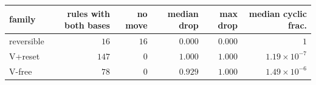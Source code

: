 \begin{tabular}{lrrrrr}
\hline
family & rules with both bases & no move & median drop & max drop & median cyclic frac. \\
\hline
reversible & $16$ & $16$ & $0.000$ & $0.000$ & $1$ \\
V+reset & $147$ & $0$ & $1.000$ & $1.000$ & $1.19\times10^{-7}$ \\
V-free & $78$ & $0$ & $0.929$ & $1.000$ & $1.49\times10^{-6}$ \\
\hline
\end{tabular}
